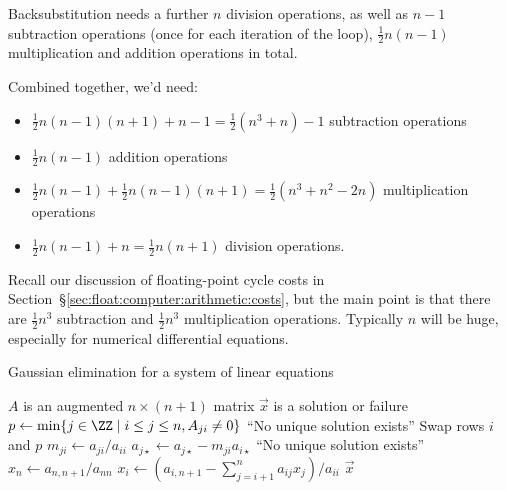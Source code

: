 Backsubstitution needs a further $n$ division operations, as well as
$n-1$ subtraction operations (once for each iteration of the loop),
$\frac{1}{2}n(n-1)$ multiplication and addition operations in total.

Combined together, we'd need:
\begin{itemize}
\item $\frac{1}{2}n(n-1)(n+1)+n-1=\frac{1}{2}(n^{3}+n)-1$ subtraction operations
\item $\frac{1}{2}n(n-1)$ addition operations
\item $\frac{1}{2}n(n-1)+\frac{1}{2}n(n-1)(n+1)=\frac{1}{2}(n^{3}+n^{2}-2n)$
  multiplication operations
\item $\frac{1}{2}n(n-1)+n=\frac{1}{2}n(n+1)$ division operations.
\end{itemize}
Recall our discussion of floating-point cycle costs in Section~\S\ref{sec:float:computer:arithmetic:costs},
but the main point is that there are $\frac{1}{2}n^{3}$ subtraction and
$\frac{1}{2}n^{3}$ multiplication operations. Typically $n$ will be
huge, especially for numerical differential equations.

\begin{algorithm}\label{alg:gauss-elim:gaussian-elimination-with-backsubstitution}
  \caption{Gaussian elimination for a system of linear equations}
  \begin{algorithmic}[1]
    \Require $A$ is an augmented $n\times(n+1)$ matrix
    \Ensure $\vec{x}$ is a solution or failure
      \State\label{alg:gauss-elim:gaussian-elimination-with-backsubstitution:pivot} $p\gets\min\{j\in\ZZ\mid i\leq j\leq n, A_{ji}\neq0\}$
        \State\Fail ``No unique solution exists''
        \State Swap rows $i$ and $p$
      \EndIf
       
        \State\label{alg:gauss-elim:gaussian-elimination-with-backsubstitution:dilate} $m_{ji}\gets a_{ji}/a_{ii}$
        \State\label{alg:gauss-elim:gaussian-elimination-with-backsubstitution:eliminate} $a_{j\star}\gets a_{j\star}-m_{ji}a_{i\star}$ 
      \EndFor
    \EndFor
      \State\Fail ``No unique solution exists''
    \EndIf
    \State $x_{n}\gets a_{n,n+1}/a_{nn}$ 
      \State $\displaystyle x_{i}\gets\left(a_{i,n+1}-\sum_{j=i+1}^{n}a_{ij}x_{j}\right)/a_{ii}$
    \EndFor
    \State\Return $\vec{x}$
  \EndFunction
\end{algorithmic}
\end{algorithm}

